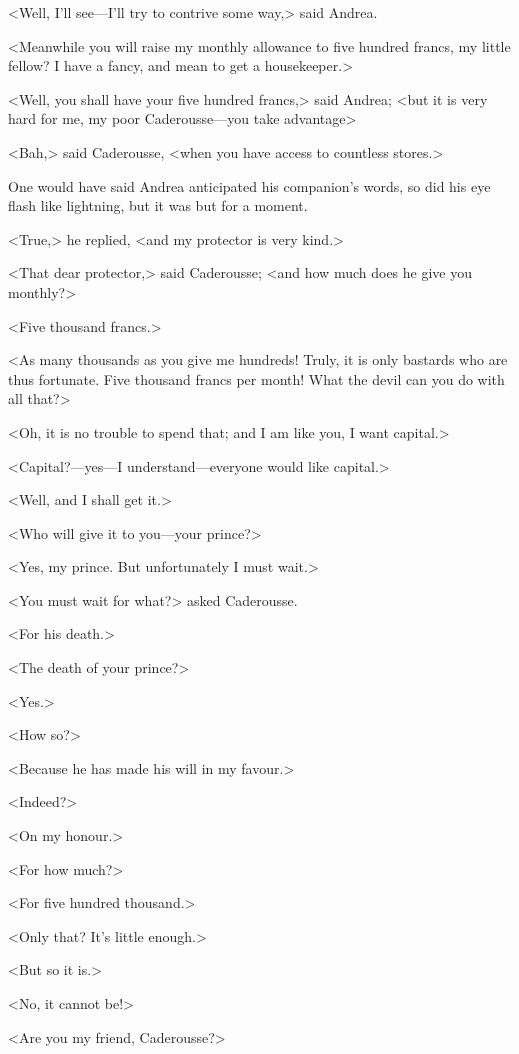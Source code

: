  <Well, I'll see—I'll try to contrive some way,> said Andrea. 

 <Meanwhile you will raise my monthly allowance to five hundred francs, my little fellow? I have a fancy, and mean to get a housekeeper.> 

 <Well, you shall have your five hundred francs,> said Andrea; <but it is very hard for me, my poor Caderousse—you take advantage\longdash> 

 <Bah,> said Caderousse, <when you have access to countless stores.> 

 One would have said Andrea anticipated his companion's words, so did his eye flash like lightning, but it was but for a moment. 

 <True,> he replied, <and my protector is very kind.> 

 <That dear protector,> said Caderousse; <and how much does he give you monthly?> 

 <Five thousand francs.> 

 <As many thousands as you give me hundreds! Truly, it is only bastards who are thus fortunate. Five thousand francs per month! What the devil can you do with all that?> 

 <Oh, it is no trouble to spend that; and I am like you, I want capital.> 

 <Capital?—yes—I understand—everyone would like capital.> 

 <Well, and I shall get it.> 

 <Who will give it to you—your prince?> 

 <Yes, my prince. But unfortunately I must wait.>

<You must wait for what?> asked Caderousse. 

 <For his death.> 

 <The death of your prince?> 

 <Yes.> 

 <How so?> 

 <Because he has made his will in my favour.> 

 <Indeed?> 

 <On my honour.> 

 <For how much?> 

 <For five hundred thousand.> 

 <Only that? It's little enough.> 

 <But so it is.> 

 <No, it cannot be!> 

 <Are you my friend, Caderousse?> 

